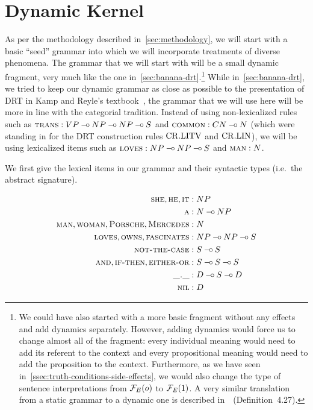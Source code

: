 \minitoc


\section{Dynamic Kernel}
\label{sec:dynamic-kernel}

As per the methodology described in~\ref{sec:methodology}, we will start
with a basic ``seed'' grammar into which we will incorporate treatments of
diverse phenomena. The grammar that we will start with will be a small
dynamic fragment, very much like the one
in~\ref{sec:banana-drt}.\footnote{We could have also started with a more
  basic fragment without any effects and add dynamics separately. However,
  adding dynamics would force us to change almost all of the fragment:
  every individual meaning would need to add its referent to the context
  and every propositional meaning would need to add the proposition to the
  context. Furthermore, as we have seen
  in~\ref{ssec:truth-conditions-side-effects}, we would also change the
  type of sentence interpretations from $\mathcal{F}_E(o)$ to $\mathcal{F}_E(1)$. A very
  similar translation from a static grammar to a dynamic one is described
  in~\cite{lebedeva2012expression}~(Definition~4.27).} While
in~\ref{sec:banana-drt}, we tried to keep our dynamic grammar as close as
possible to the presentation of DRT in Kamp and Reyle's
textbook~\cite{kamp1993discourse}, the grammar that we will use here will
be more in line with the categorial tradition. Instead of using
non-lexicalized rules such as $\textsc{trans} : VP \mathbin{{-}\mkern-3.5mu{\circ}} NP \mathbin{{-}\mkern-3.5mu{\circ}} NP \mathbin{{-}\mkern-3.5mu{\circ}} S$
and $\textsc{common} : CN \mathbin{{-}\mkern-3.5mu{\circ}} N$ (which were standing in for the DRT
construction rules $\mathrm{CR.LITV}$ and $\mathrm{CR.LIN}$), we will be using lexicalized
items such as $\textsc{loves} : NP \mathbin{{-}\mkern-3.5mu{\circ}} NP \mathbin{{-}\mkern-3.5mu{\circ}} S$ and $\textsc{man} : N$.

We first give the lexical items in our grammar and their syntactic types
(i.e.\ the abstract signature).

\begin{align*}
  \textsc{she}, \textsc{he}, \textsc{it} &: NP \\
  \textsc{a} &: N \mathbin{{-}\mkern-3.5mu{\circ}} NP \\
  \textsc{man}, \textsc{woman}, \textsc{Porsche}, \textsc{Mercedes} &: N \\
  \textsc{loves}, \textsc{owns}, \textsc{fascinates} &: NP \mathbin{{-}\mkern-3.5mu{\circ}} NP \mathbin{{-}\mkern-3.5mu{\circ}} S \\
  \textsc{not-the-case} &: S \mathbin{{-}\mkern-3.5mu{\circ}} S \\
  \textsc{and}, \textsc{if-then}, \textsc{either-or} &: S \mathbin{{-}\mkern-3.5mu{\circ}} S \mathbin{{-}\mkern-3.5mu{\circ}} S \\
  \textsc{\_.\_} &: D \mathbin{{-}\mkern-3.5mu{\circ}} S \mathbin{{-}\mkern-3.5mu{\circ}} D \\
  \textsc{nil} &: D
\end{align*}

